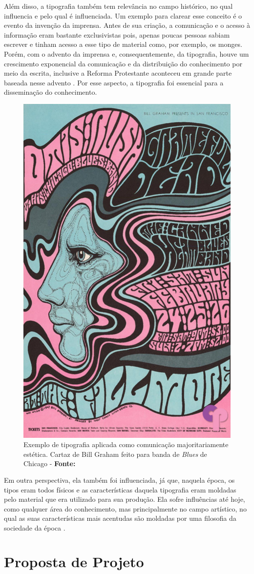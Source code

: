 Além disso, a tipografia também tem relevância no campo histórico, no qual influencia e pelo qual é influenciada. Um exemplo para clarear esse conceito é o evento da invenção da imprensa. Antes de sua criação, a comunicação e o acesso à informação eram bastante exclusivistas pois, apenas poucas pessoas sabiam escrever e tinham acesso a esse tipo de material como, por exemplo, os monges. Porém, com o advento da imprensa e, consequentemente, da tipografia, houve um crescimento exponencial da comunicação e da distribuição do conhecimento por meio da escrita, inclusive a Reforma Protestante aconteceu em grande parte baseada nesse advento . Por esse aspecto, a tipografia foi essencial para a disseminação do conhecimento.

\begin{figure}[H]
 \centering
  \includegraphics[width=0.4\linewidth]{figuras/posterTipo.pdf}
  \caption{Exemplo de tipografia aplicada como comunicação majoritariamente estética. Cartaz de Bill Graham feito para banda de \textit{Blues} de Chicago - \textbf{Fonte:} }
  \label{fig:posterTipo}
\end{figure}

Em outra perspectiva, ela também foi influenciada, já que, naquela época, os tipos eram todos físicos e as características daquela tipografia eram moldadas pelo material que era utilizado para sua produção. Ela sofre influências até hoje, como qualquer área do conhecimento, mas principalmente no campo artístico, no qual as suas características mais acentudas são moldadas por uma filosofia da sociedade da época  .


\section{Proposta de Projeto}

